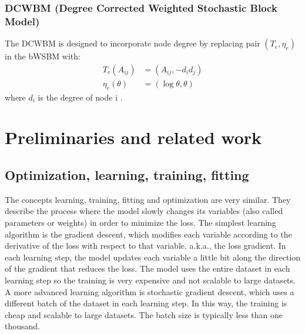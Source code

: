 \documentclass[12pt]{WSUThesis}
\theoremstyle{definition}
\begin{document}
\subsection{DCWBM (Degree Corrected Weighted Stochastic Block Model)}
The DCWBM is designed to incorporate node degree
by replacing pair $ (T_e, \eta_e) $ in the bWSBM with:
\begin{align*}
T_e(A_{ij}) &= (A_{ij}, -d_id_j)\\
\eta_e(\theta) &= (\log\theta, \theta)
\end{align*}
where $ d_i $ is the degree of node i \cite{aicher2014learning}.

\chapter{Preliminaries and related work}

\section{Optimization, learning, training, fitting}
The concepts learning, training, fitting and optimization are very similar. They describe the process where the model slowly changes its variables (also called parameters or weights) in order to minimize the loss. The simplest learning algorithm is the gradient descent, which modifies each variable according to the derivative of the loss with respect to that variable, a.k.a., the loss gradient.
In each learning step, the model updates each variable a little bit along the direction of the gradient that reduces the loss.
The model uses the entire dataset in each learning step so the training is very expensive and not scalable to large datasets.
A more advanced learning algorithm is stochastic gradient descent, which uses a different batch of the dataset in each learning step.
In this way, the training is cheap and scalable to large datasets.
The batch size is typically less than one thousand.
\end{document}

